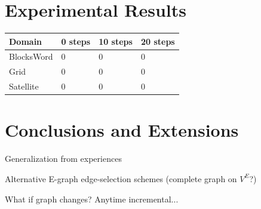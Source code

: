 \documentclass[letterpaper]{article}
\begin{document}
\section{Experimental Results}

\begin{center}
    \begin{tabular}{| l | l | l | l |}
    \hline
    Domain & 0 steps & 10 steps & 20 steps
    \\ \hline
    BlocksWord & 0 & 0 & 0
    \\ \hline
    Grid & 0 & 0 & 0
    \\ \hline
    Satellite & 0 & 0 & 0
    \\ \hline
    \end{tabular}
\end{center}

\section{Conclusions and Extensions}

Generalization from experiences

Alternative E-graph edge-selection schemes (complete graph on $V^E$?)

What if graph changes? Anytime incremental...
\end{document}
